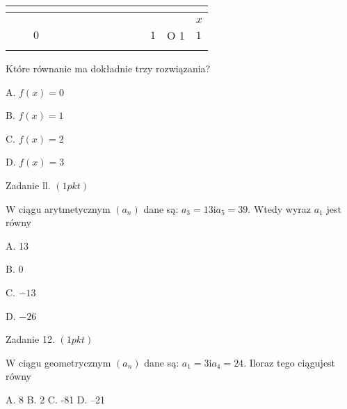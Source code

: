 \documentclass[a4paper,12pt]{article}
\begin{document}
\begin{center}
\begin{tabular}{|l|l|l|l|l|l|l|l|l|l|l|l|l|l|l|}
\hline
\multicolumn{1}{|l|}{}&	\multicolumn{1}{|l|}{}&	\multicolumn{1}{|l|}{}&	\multicolumn{1}{|l|}{}&	\multicolumn{1}{|l|}{}&	\multicolumn{1}{|l|}{}&	\multicolumn{1}{|l|}{}&	\multicolumn{1}{|l|}{}&	\multicolumn{1}{|l|}{}&	\multicolumn{1}{|l|}{}&	\multicolumn{1}{|l|}{}&	\multicolumn{1}{|l|}{}&	\multicolumn{1}{|l|}{}&	\multicolumn{1}{|l|}{}&	\multicolumn{1}{|l|}{}	\\
\hline
\multicolumn{1}{|l|}{}&	\multicolumn{1}{|l|}{}&	\multicolumn{1}{|l|}{}&	\multicolumn{1}{|l|}{}&	\multicolumn{1}{|l|}{}&	\multicolumn{1}{|l|}{}&	\multicolumn{1}{|l|}{}&	\multicolumn{1}{|l|}{}&	\multicolumn{1}{|l|}{}&	\multicolumn{1}{|l|}{}&	\multicolumn{1}{|l|}{}&	\multicolumn{1}{|l|}{}&	\multicolumn{1}{|l|}{}&	\multicolumn{1}{|l|}{}&	\multicolumn{1}{|l|}{}	\\
\hline
\multicolumn{1}{|l|}{}&	\multicolumn{1}{|l|}{}&	\multicolumn{1}{|l|}{}&	\multicolumn{1}{|l|}{}&	\multicolumn{1}{|l|}{}&	\multicolumn{1}{|l|}{}&	\multicolumn{1}{|l|}{}&	\multicolumn{1}{|l|}{}&	\multicolumn{1}{|l|}{}&	\multicolumn{1}{|l|}{}&	\multicolumn{1}{|l|}{}&	\multicolumn{1}{|l|}{}&	\multicolumn{1}{|l|}{}&	\multicolumn{1}{|l|}{}&	\multicolumn{1}{|l|}{ $x$}	\\
\hline
\multicolumn{1}{|l|}{}&	\multicolumn{1}{|l|}{}&	\multicolumn{1}{|l|}{ $0$}&	\multicolumn{1}{|l|}{}&	\multicolumn{1}{|l|}{}&	\multicolumn{1}{|l|}{}&	\multicolumn{1}{|l|}{}&	\multicolumn{1}{|l|}{}&	\multicolumn{1}{|l|}{}&	\multicolumn{1}{|l|}{}&	\multicolumn{1}{|l|}{}&	\multicolumn{1}{|l|}{}&	\multicolumn{1}{|l|}{ $1$}&	\multicolumn{1}{|l|}{O 1}&	\multicolumn{1}{|l|}{$1$}	\\
\hline
\multicolumn{1}{|l|}{}&	\multicolumn{1}{|l|}{}&	\multicolumn{1}{|l|}{}&	\multicolumn{1}{|l|}{}&	\multicolumn{1}{|l|}{}&	\multicolumn{1}{|l|}{}&	\multicolumn{1}{|l|}{}&	\multicolumn{1}{|l|}{}&	\multicolumn{1}{|l|}{}&	\multicolumn{1}{|l|}{}&	\multicolumn{1}{|l|}{}&	\multicolumn{1}{|l|}{}&	\multicolumn{1}{|l|}{}&	\multicolumn{1}{|l|}{}&	\multicolumn{1}{|l|}{}	\\
\hline
\end{tabular}

\end{center}
Które równanie ma dokładnie trzy rozwiązania?

A. $f(x)=0$

B. $f(x)=1$

C. $f(x)=2$

D. $f(x)=3$

Zadanie ll. $(1pkt)$

$\mathrm{W}$ ciągu arytmetycznym $(a_{n})$ dane są: $a_{3}=13\mathrm{i}a_{5}=39$. Wtedy wyraz $a_{1}$ jest równy

A. 13

B. 0

C. $-13$

D. $-26$

Zadanie 12. $(1pkt)$

$\mathrm{W}$ ciągu geometrycznym $(a_{n})$ dane są: $a_{1}=3\mathrm{i}a_{4}=24$. Iloraz tego ciągujest równy

A. 8 B. 2 C. -81 D. --21
\end{document}

